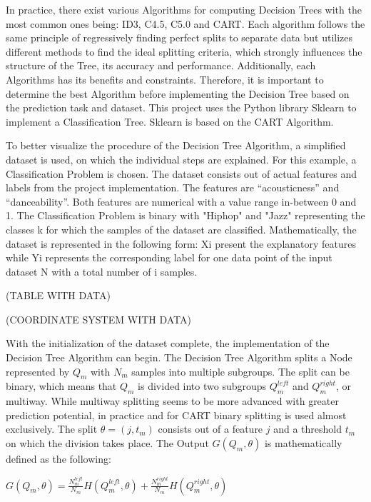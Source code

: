 In practice, there exist various Algorithms for computing Decision Trees with the most common ones 
being: ID3, C4.5, C5.0 and CART. Each algorithm follows the same principle of regressively finding 
perfect splits to separate data but utilizes different methods to find the ideal splitting 
criteria, which strongly influences the structure of the Tree, its accuracy and performance. 
Additionally, each Algorithms has its benefits and constraints. Therefore, it is important to 
determine the best Algorithm before implementing the Decision Tree based on the prediction task 
and dataset. This project uses the Python library Sklearn to implement a Classification Tree. 
Sklearn is based on the CART Algorithm.

To better visualize the procedure of the Decision Tree Algorithm, a simplified dataset is used, 
on which the individual steps are explained. For this example, a Classification Problem is chosen. 
The dataset consists out of actual features and labels from the project implementation. The 
features are “acousticness” and “danceability”. Both features are numerical with a value range 
in-between 0 and 1. The Classification Problem is binary with "Hiphop" and "Jazz" representing 
the classes k for which the samples of the dataset are classified. Mathematically, the dataset 
is represented in the following form:  Xi present the explanatory features while Yi represents 
the corresponding label for one data point of the input dataset N with a total number of i 
samples.

(TABLE WITH DATA)

(COORDINATE SYSTEM WITH DATA)

With the initialization of the dataset complete, the implementation of the Decision Tree 
Algorithm can begin. The Decision Tree Algorithm splits a Node represented by \(Q_{m}\) with \(N_{m}\) samples 
into multiple subgroups. The split can be binary, which means that \(Q_{m}\) is divided into two 
subgroups \(Q^{left}_{m}\) and \(Q^{right}_{m}\), or multiway. While multiway splitting seems to be more advanced 
with greater prediction potential, in practice and for CART binary splitting is used almost 
exclusively. The split \(\theta = (j, t_{m})\) consists out of a feature \(j\) and a threshold \(t_{m}\) on which the 
division takes place. The Output \(G(Q_{m},\theta)\) is mathematically defined as the following: 

\(G(Q_{m},\theta) = \frac{N^{left}_{m}}{N_{m}} H(Q^{left}_{m}, \theta ) + \frac{N^{right}_{m}}{N_{m}} H(Q^{right}_{m}, \theta ) \)

